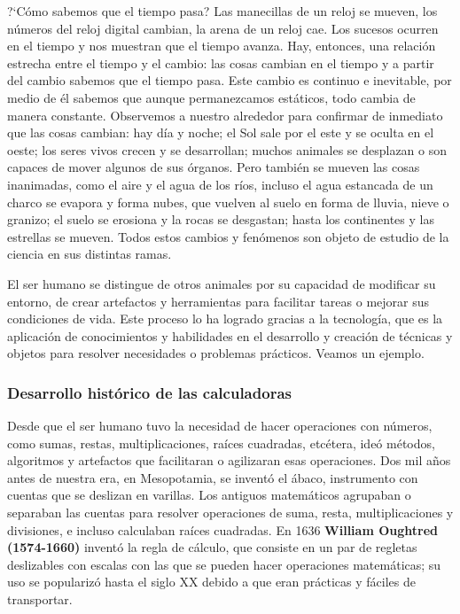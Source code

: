 \documentclass[11pt]{book}
\begin{document}
?`C\'omo sabemos que el tiempo pasa? Las manecillas de un reloj se mueven, los
n\'umeros del reloj digital cambian, la arena de un
reloj cae. Los sucesos ocurren en el tiempo y nos muestran que el tiempo
avanza. Hay, entonces, una relaci\'on estrecha entre el
tiempo y el cambio: las cosas cambian en el tiempo y a partir del cambio
sabemos que el tiempo pasa. Este cambio es continuo e
inevitable, por medio de \'el sabemos que aunque permanezcamos est\'aticos, todo
cambia de manera constante.
Observemos a nuestro alrededor para confirmar de inmediato que las cosas
cambian: hay d\'ia y noche; el Sol sale por el este y
se oculta en el oeste; los seres vivos crecen y se desarrollan; muchos animales
se desplazan o son capaces de mover algunos de
sus \'organos. Pero tambi\'en se mueven las cosas inanimadas, como el aire y el
agua de los r\'ios, incluso el agua estancada de un
charco se evapora y forma nubes, que vuelven al suelo en forma de lluvia, nieve
o granizo; el suelo se erosiona y la rocas se
desgastan; hasta los continentes y las estrellas se mueven. Todos estos cambios
y fen\'omenos son objeto de estudio de la ciencia
en sus distintas ramas.

El ser humano se distingue de otros animales por su capacidad de modificar su
entorno, de crear artefactos y herramientas para
facilitar tareas o mejorar sus condiciones de vida. Este proceso lo ha logrado
gracias a la tecnolog\'ia, que es la aplicaci\'on de
conocimientos y habilidades en el desarrollo y creaci\'on de t\'ecnicas y objetos
para resolver necesidades o problemas pr\'acticos.
Veamos un ejemplo.

\subsubsection{Desarrollo hist\'orico de las calculadoras}
Desde que el ser humano tuvo la necesidad de hacer operaciones con n\'umeros,
como sumas, restas, multiplicaciones, ra\'ices
cuadradas, etc\'etera, ide\'o m\'etodos, algoritmos y artefactos que facilitaran o
agilizaran esas operaciones.
Dos mil años antes de nuestra era, en Mesopotamia, se invent\'o el \'abaco,
instrumento con cuentas que se deslizan en varillas.
Los antiguos matem\'aticos agrupaban o separaban las cuentas para resolver
operaciones de suma, resta, multiplicaciones y
divisiones, e incluso calculaban ra\'ices cuadradas.
En 1636 \textbf{William Oughtred (1574-1660)} invent\'o la regla de c\'alculo, que
consiste en un par de regletas deslizables con
escalas con las que se pueden hacer operaciones matem\'aticas; su uso se
populariz\'o hasta el siglo XX debido a que eran pr\'acticas
y f\'aciles de transportar.
\end{document}
